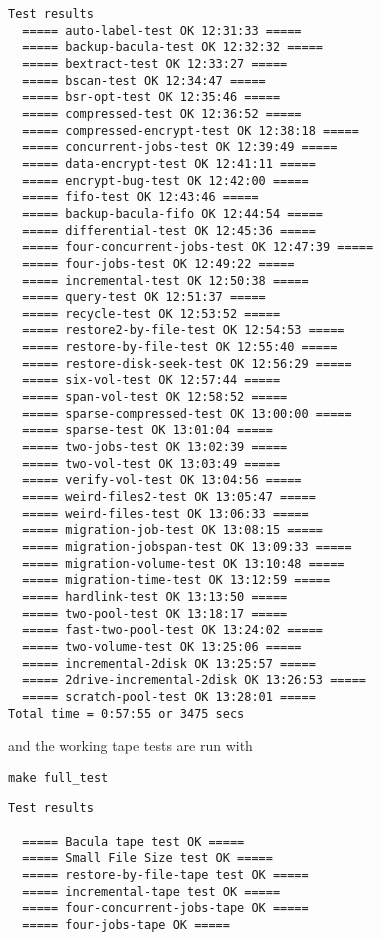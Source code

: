 \footnotesize
\begin{verbatim}
Test results
  ===== auto-label-test OK 12:31:33 =====
  ===== backup-bacula-test OK 12:32:32 =====
  ===== bextract-test OK 12:33:27 =====
  ===== bscan-test OK 12:34:47 =====
  ===== bsr-opt-test OK 12:35:46 =====
  ===== compressed-test OK 12:36:52 =====
  ===== compressed-encrypt-test OK 12:38:18 =====
  ===== concurrent-jobs-test OK 12:39:49 =====
  ===== data-encrypt-test OK 12:41:11 =====
  ===== encrypt-bug-test OK 12:42:00 =====
  ===== fifo-test OK 12:43:46 =====
  ===== backup-bacula-fifo OK 12:44:54 =====
  ===== differential-test OK 12:45:36 =====
  ===== four-concurrent-jobs-test OK 12:47:39 =====
  ===== four-jobs-test OK 12:49:22 =====
  ===== incremental-test OK 12:50:38 =====
  ===== query-test OK 12:51:37 =====
  ===== recycle-test OK 12:53:52 =====
  ===== restore2-by-file-test OK 12:54:53 =====
  ===== restore-by-file-test OK 12:55:40 =====
  ===== restore-disk-seek-test OK 12:56:29 =====
  ===== six-vol-test OK 12:57:44 =====
  ===== span-vol-test OK 12:58:52 =====
  ===== sparse-compressed-test OK 13:00:00 =====
  ===== sparse-test OK 13:01:04 =====
  ===== two-jobs-test OK 13:02:39 =====
  ===== two-vol-test OK 13:03:49 =====
  ===== verify-vol-test OK 13:04:56 =====
  ===== weird-files2-test OK 13:05:47 =====
  ===== weird-files-test OK 13:06:33 =====
  ===== migration-job-test OK 13:08:15 =====
  ===== migration-jobspan-test OK 13:09:33 =====
  ===== migration-volume-test OK 13:10:48 =====
  ===== migration-time-test OK 13:12:59 =====
  ===== hardlink-test OK 13:13:50 =====
  ===== two-pool-test OK 13:18:17 =====
  ===== fast-two-pool-test OK 13:24:02 =====
  ===== two-volume-test OK 13:25:06 =====
  ===== incremental-2disk OK 13:25:57 =====
  ===== 2drive-incremental-2disk OK 13:26:53 =====
  ===== scratch-pool-test OK 13:28:01 =====
Total time = 0:57:55 or 3475 secs

\end{verbatim}
\normalsize

and the working tape tests are run with

\footnotesize
\begin{verbatim}
make full_test
\end{verbatim}
\normalsize


\footnotesize
\begin{verbatim}
Test results
  
  ===== Bacula tape test OK =====
  ===== Small File Size test OK =====
  ===== restore-by-file-tape test OK =====
  ===== incremental-tape test OK =====
  ===== four-concurrent-jobs-tape OK =====
  ===== four-jobs-tape OK =====
\end{verbatim}
\normalsize

